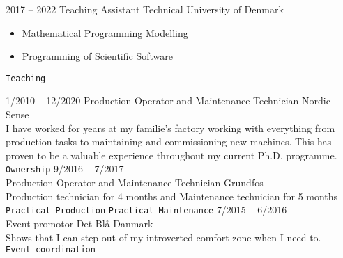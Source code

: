\documentclass[9pt]{developercv} %
\begin{document}
\vspace{-10 pt}
\begin{entrylist}
	\entry
        {2017 -- 2022}
		{Teaching Assistant}
		{Technical University of Denmark}
		{
			\vspace{-10pt}
	        \begin{itemize}[noitemsep,topsep=0pt,parsep=0pt,partopsep=0pt, leftmargin=-1pt]
	            \item Mathematical Programming Modelling 
	            \item Programming of Scientific Software
	        \end{itemize} 
	        \texttt{Teaching}
		}
	\entry
		{1/2010 -- 12/2020}
		{Production Operator and Maintenance Technician}
		{Nordic Sense}
		{
			\vspace{-10pt}\\
			I have worked for years at my familie's factory working with everything from \\
			production tasks to maintaining and commissioning new machines. This has \\ 
			proven to be a valuable experience throughout my current Ph.D. programme.\\
			\texttt{Ownership}
        }
	\entry
		{9/2016 -- 7/2017 \\\footnotesize{}}
		{Production Operator and Maintenance Technician}
		{Grundfos}
		{
			\vspace{-10pt}\\
	        Production technician for 4 months and Maintenance technician for 5 months\\
			\texttt{Practical Production} \slashsep \texttt{Practical Maintenance}
        }
	\entry
		{7/2015 -- 6/2016 \\\footnotesize{}}
		{Event promotor}
		{Det Blå Danmark}
		{
			\vspace{-10pt}\\
	    	Shows that I can step out of my introverted comfort zone when I need to. \\
	        \texttt{Event coordination}
		}
\end{entrylist}
\end{document}
